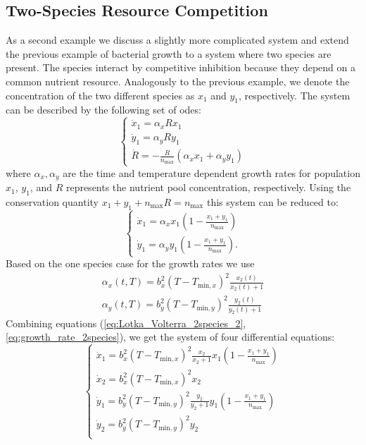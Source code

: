 \documentclass[graybox]{svmult}
\begin{document}
\subsection*{Two-Species Resource Competition}
As a second example we discuss a slightly more complicated system and extend the previous example of bacterial growth to a system where two species are present.
The species interact by competitive inhibition because they depend on a common nutrient resource.
Analogously to the previous example, we denote the concentration of the two different species as $x_1$ and $y_1$, respectively.
The system can be described by the following set of \acp{ode}:
\begin{equation}
    \begin{cases}
        \dot x_1 = \alpha_x R x_1 \\
        \dot y_1 = \alpha_y R y_1 \\
        \dot R = -\frac{R}{n_\text{max}}(\alpha_x x_1+\alpha_y y_1)
    \end{cases}
    \label{eq:Lotka_Volterra_2species_1}
\end{equation}
where $\alpha_x, \alpha_y$ are the time and temperature dependent growth rates for population $x_1$, $y_1$, and $R$ represents the nutrient pool concentration, respectively.
Using the conservation quantity $x_1 + y_1 + n_\text{max}R = n_\text{max}$ this system can be reduced to:
\begin{equation}
    \begin{cases}
        \dot x_1 = \alpha_x x_1\left(1-\frac{x_1+y_1}{n_\text{max}}\right) \\
        \dot y_1 = \alpha_y y_1\left(1-\frac{x_1+y_1}{n_\text{max}}\right).
    \end{cases}
    \label{eq:Lotka_Volterra_2species_2}
\end{equation}
Based on the one species case for the growth rates we use \cite{baranyiDynamicApproach1994,ratkowsky_relationship_1982}
\begin{eqnarray}
    \alpha_x (t, T) = b_x^2 (T - T_{\text{min}, x})^2 \frac{x_2(t)}{x_2(t) + 1}\\
    \alpha_y (t, T) = b_y^2 (T - T_{\text{min}, y})^2 \frac{y_2(t)}{y_2(t) + 1}
    \label{eq:growth_rate_2species}
\end{eqnarray}
Combining equations (\ref{eq:Lotka_Volterra_2species_2}, \ref{eq:growth_rate_2species}), we get the system of four differential equations:
\begin{equation}
    \begin{cases}
        \dot x_1 = b_x^2 (T - T_{\text{min}, x})^2 \frac{x_2}{x_2 + 1} x_1 (1 - \frac{x_1 + y_1}{n_\text{max}})\\
        \dot x_2 = b_x^2 (T - T_{\text{min}, x})^2 x_2 \\
        \dot y_1 = b_y^2 (T - T_{\text{min}, y})^2 \frac{y_2}{y_2 + 1} y_1 (1 - \frac{x_1 + y_1}{n_\text{max}})\\
        \dot y_2 = b_y^2 (T - T_{\text{min}, y})^2 y_2 \\
    \end{cases}
    \label{eq:model_2species_resource}
\end{equation}
\end{document}
